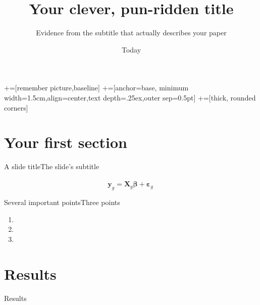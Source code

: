 \documentclass[english,10pt,aspectratio=1610]{beamer}
\title{Your clever, pun-ridden title}
\subtitle{Evidence from the subtitle that actually describes your paper}
\author[Names]{%
  \texorpdfstring{%
    \begin{columns}
      \column{.3\linewidth}
      \centering
      {Author One} \\ \textcolor{my-light-grey}{A School}
      \column{.3\linewidth}
      \centering
      {Author Two} \\ \textcolor{my-light-grey}{B School}
    \end{columns}
 }
 {Author One, Author Two}
}
\date{Today}
\begin{document}
\maketitle

\newcommand\tabnode[1]{\addtocounter{nodecount}{1} \tikz \node  (\arabic{nodecount}) {#1};}
+=[remember picture,baseline]
+=[anchor=base,
minimum width=1.5cm,align=center,text depth=.25ex,outer sep=0.5pt]
+=[thick, rounded corners]

\section{Your first section}

\begin{frame}{A slide title}{The slide's subtitle}
  \lipsumsentence[1-2] \\ \vspace{2em}
  \pause
  \lipsumsentence[3] \\ \vspace{2em}
  \pause
  \lipsumsentence[4]
  \[ \mathbf{y}_g = \mathbf{X}_g \boldsymbol{\beta} + \boldsymbol{\varepsilon}_g \ \]
\end{frame}

\begin{frame}{Several important points}{Three points}
\textbf{\lipsumsentence[5]}
  \begin{enumerate}
    \item \lipsumsentence[6]
    \item \lipsumsentence[7]
    \item \lipsumsentence[8]
  \end{enumerate}
\end{frame}

\section{Results}

\begin{frame}
\textcolor{my-dark-grey}{\large Results}
\end{frame}
\end{document}
